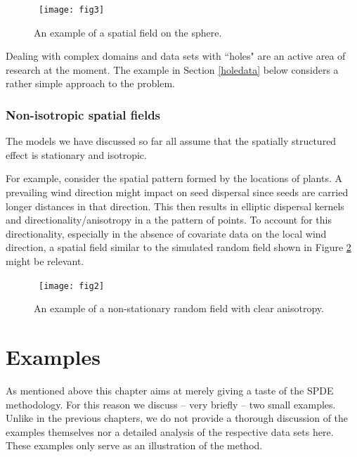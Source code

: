\begin{figure}[t]
  \centering
   \mbox{
\texttt{[image: fig3]}
}
\caption{An example of a spatial field on the sphere. \label{sphere}}
\end{figure}

Dealing with complex domains and data sets with ``holes" are an active area of research at the moment. The example in Section \ref{holedata} below considers a rather simple approach to the problem.

\subsubsection{Non-isotropic spatial fields}
The models we have discussed so far all assume that the spatially structured effect is stationary and isotropic. 

For example, consider the spatial pattern formed by the locations of plants. A prevailing wind direction might impact on seed dispersal since seeds are carried longer distances in that direction. This then results in elliptic dispersal kernels and  directionality/anisotropy in a the pattern of points. To account for this directionality, especially in the absence of covariate data on the local wind direction, a spatial field similar to the simulated random field shown in Figure \ref{non-stat} might be relevant.


\begin{figure}[t]
  \centering
   \mbox{
\texttt{[image: fig2]}
}
\caption{An example of a non-stationary random field with clear anisotropy. \label{non-stat}}
\end{figure}


\section{Examples}\label{spdeexamples}
As mentioned above this chapter aims at merely giving a taste of the SPDE methodology. For this reason we discuss -- very briefly  -- two small examples. Unlike in the previous chapters, we do not provide a thorough discussion of the examples themselves nor a detailed analysis of the respective data sets here. These examples  only serve as an illustration of the method.

